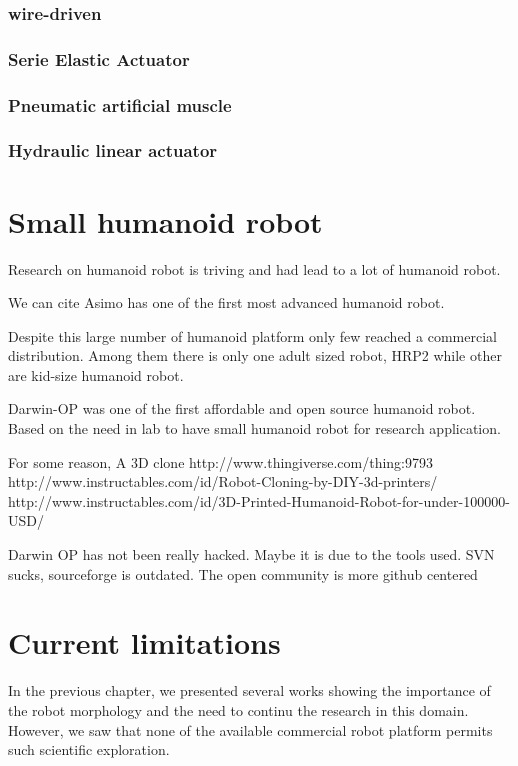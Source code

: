 \subsubsection{wire-driven} %

\subsubsection{Serie Elastic Actuator} %

\subsubsection{Pneumatic artificial muscle} %

\subsubsection{Hydraulic linear actuator} %


\section{Small humanoid robot} %
Research on humanoid robot is triving and had lead to a lot of humanoid robot.

We can cite Asimo has one of the first most advanced humanoid robot.

Despite this large number of humanoid platform only few reached a commercial distribution.
Among them there is only one adult sized robot, HRP2 while other are kid-size humanoid robot.

Darwin-OP was one of the first affordable and open source humanoid robot.
Based on the need in lab to have small  humanoid robot for research application.

For some reason, A 3D clone http://www.thingiverse.com/thing:9793
http://www.instructables.com/id/Robot-Cloning-by-DIY-3d-printers/
http://www.instructables.com/id/3D-Printed-Humanoid-Robot-for-under-100000-USD/

Darwin OP has not been really hacked.
Maybe it is due to the tools used.
SVN sucks, sourceforge is outdated.
The open community is more github centered


\section{Current limitations}

In the previous chapter, we presented several works showing the importance of the robot morphology and the need to continu the research in this domain.
However, we saw that none of the available commercial robot platform permits such scientific exploration.

